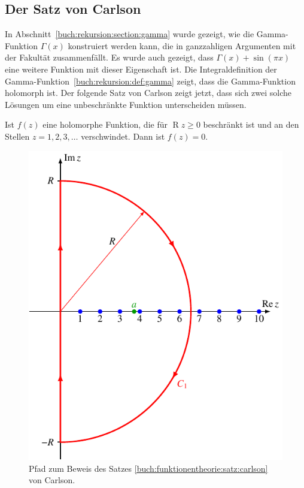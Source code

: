 %
%
%
\subsection{Der Satz von Carlson
\label{buch:funktionentheorie:subsection:satz-von-carlson}}
In Abschnitt~\ref{buch:rekursion:section:gamma} wurde gezeigt,
wie die Gamma-Funktion $\Gamma(x)$ konstruiert werden kann, die
in ganzzahligen Argumenten mit der Fakultät zusammenfällt.
Es wurde auch gezeigt, dass $\Gamma(x)+\sin(\pi x)$ eine
weitere Funktion mit dieser Eigenschaft ist.
Die Integraldefinition der
Gamma-Funktion~\ref{buch:rekursion:def:gamma} zeigt, dass
die Gamma-Funktion holomorph ist.
Der folgende Satz von Carlson zeigt jetzt, dass sich
zwei solche Lösungen um eine unbeschränkte Funktion
unterscheiden müssen.

\begin{satz}[Carlson]
\label{buch:funktionentheorie:satz:carlson}
Ist $f(z)$ eine holomorphe Funktion, die für $\operatorname{R}z\ge 0$
beschränkt ist und an den Stellen $z=1,2,3,\dots$ verschwindet.
Dann ist $f(z)=0$.
\end{satz}

%
%
\begin{figure}
\centering
\includegraphics{chapters/080-funktionentheorie/images/carlsonpath.pdf}
\caption{Pfad zum Beweis des Satzes \ref{buch:funktionentheorie:satz:carlson}
von Carlson.
\label{buch:funktionentheorie:fig:carlsonpath}}
\end{figure}

